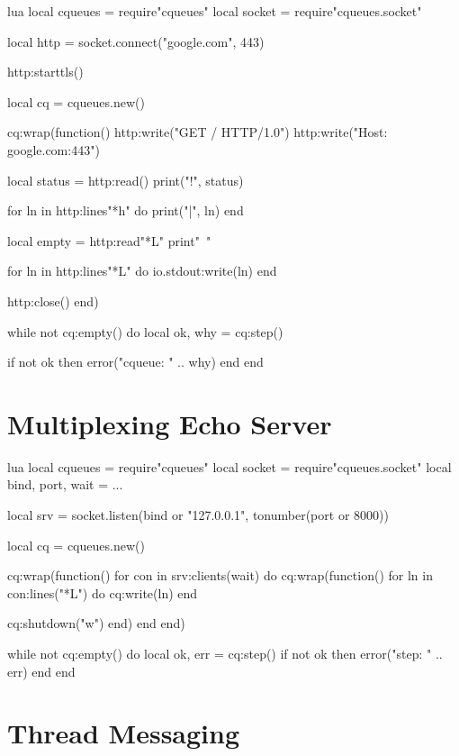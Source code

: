 \documentclass[11pt, oneside]{memoir}
\begin{document}
\begin{example}{lua}
local cqueues = require"cqueues"
local socket = require"cqueues.socket"

local http = socket.connect("google.com", 443)

http:starttls()

local cq = cqueues.new()

cq:wrap(function()
	http:write("GET / HTTP/1.0\n")
	http:write("Host: google.com:443\n\n")

	local status = http:read()
	print("!", status)

	for ln in http:lines"*h" do
		print("|", ln)
	end

	local empty = http:read"*L"
	print"~"

	for ln in http:lines"*L" do
		io.stdout:write(ln)
	end

	http:close()
end)

while not cq:empty() do
	local ok, why = cq:step()

	if not ok then
		error("cqueue: " .. why)
	end
end
\end{example}


\clearpage
\section{Multiplexing Echo Server}

\begin{example}{lua}
local cqueues = require"cqueues"
local socket = require"cqueues.socket"
local bind, port, wait = ...

local srv = socket.listen(bind or "127.0.0.1", tonumber(port or 8000))

local cq = cqueues.new()

cq:wrap(function()
	for con in srv:clients(wait) do
		cq:wrap(function()
			for ln in con:lines("*L") do
				cq:write(ln)
			end

			cq:shutdown("w")
		end)
	end
end)

while not cq:empty() do
	local ok, err = cq:step()
	if not ok then error("step: " .. err) end
end
\end{example}

\clearpage
\section{Thread Messaging}
\end{document}
